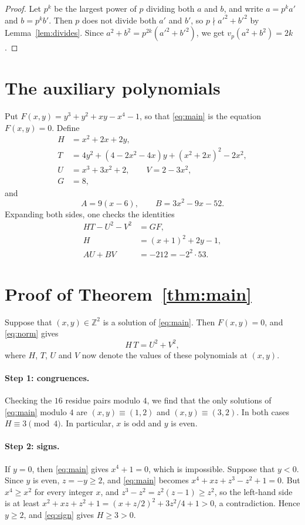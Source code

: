 \documentclass[11pt]{article}
\newcommand{\Z}{\mathbb{Z}}
\begin{document}
\begin{proof}
Let $p^k$ be the largest power of $p$ dividing both $a$ and $b$, and write $a=p^ka'$ and $b=p^kb'$. Then $p$ does not divide both $a'$ and $b'$, so $p\nmid a'^2+b'^2$ by Lemma~\ref{lem:divides}. Since $a^2+b^2=p^{2k}(a'^2+b'^2)$, we get $v_p(a^2+b^2)=2k$.
\end{proof}

\section{The auxiliary polynomials}

Put $F(x,y)=y^3+y^2+xy-x^4-1$, so that \eqref{eq:main} is the equation $F(x,y)=0$. Define
\begin{align*}
H&=x^2+2x+2y,\\
T&=4y^2+(4-2x^2-4x)y+(x^2+2x)^2-2x^2,\\
U&=x^3+3x^2+2,\qquad V=2-3x^2,\\
G&=8,
\end{align*}
and
\[
A=9(x-6),\qquad B=3x^2-9x-52.
\]
Expanding both sides, one checks the identities
\begin{align}
HT-U^2-V^2&=GF,\label{eq:norm}\\
H&=(x+1)^2+2y-1,\label{eq:sign}\\
AU+BV&=-212=-2^2\cdot53.\label{eq:bezout}
\end{align}

\section{Proof of Theorem~\ref{thm:main}}

Suppose that $(x,y)\in\Z^2$ is a solution of \eqref{eq:main}. Then $F(x,y)=0$, and \eqref{eq:norm} gives
\begin{equation}\label{eq:HT}
H\,T=U^2+V^2,
\end{equation}
where $H$, $T$, $U$ and $V$ now denote the values of these polynomials at $(x,y)$.

\paragraph{Step 1: congruences.} Checking the $16$ residue pairs modulo $4$, we find that the only solutions of \eqref{eq:main} modulo $4$ are $(x,y)\equiv(1,2)$ and $(x,y)\equiv(3,2)$. In both cases $H\equiv3\pmod4$. In particular, $x$ is odd and $y$ is even.

\paragraph{Step 2: signs.} If $y=0$, then \eqref{eq:main} gives $x^4+1=0$, which is impossible. Suppose that $y<0$. Since $y$ is even, $z=-y\geq2$, and \eqref{eq:main} becomes $x^4+xz+z^3-z^2+1=0$. But $x^4\geq x^2$ for every integer $x$, and $z^3-z^2=z^2(z-1)\geq z^2$, so the left-hand side is at least $x^2+xz+z^2+1=(x+z/2)^2+3z^2/4+1>0$, a contradiction. Hence $y\geq2$, and \eqref{eq:sign} gives $H\geq3>0$.
\end{document}
